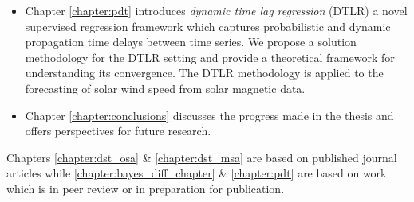 \begin{itemize}
    \item Chapter \ref{chapter:pdt} introduces \emph{dynamic time lag regression} (DTLR) a novel supervised 
    regression framework which captures probabilistic and dynamic propagation time delays between time series. 
    We propose a solution methodology for the DTLR setting and provide a theoretical framework for understanding 
    its convergence. The DTLR methodology is applied to the forecasting of solar wind speed from solar magnetic data. 
    
    \item Chapter \ref{chapter:conclusions} discusses the progress made in the thesis and offers perspectives for 
    future research.
\end{itemize}


Chapters \ref{chapter:dst_osa} \& \ref{chapter:dst_msa} are based on published journal articles 
while \ref{chapter:bayes_diff_chapter} \& \ref{chapter:pdt} are based on work which is in peer review or in 
preparation for publication.  